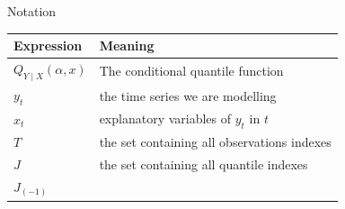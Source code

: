 \documentclass[11pt]{beamer}
\begin{document}
\begin{frame}{Notation}

\small

\begin{longtable}[]{@{}ll@{}}
\toprule
\begin{minipage}[b]{0.14\columnwidth}\raggedright\strut
Expression\strut
\end{minipage} & \begin{minipage}[b]{0.80\columnwidth}\raggedright\strut
Meaning\strut
\end{minipage}\tabularnewline
\midrule
\endhead
\begin{minipage}[t]{0.14\columnwidth}\raggedright\strut
\(Q_{Y \mid X}(\alpha,x)\)\strut
\end{minipage} & \begin{minipage}[t]{0.80\columnwidth}\raggedright\strut
The conditional quantile function\strut
\end{minipage}\tabularnewline
\begin{minipage}[t]{0.14\columnwidth}\raggedright\strut
\(y_t\)\strut
\end{minipage} & \begin{minipage}[t]{0.80\columnwidth}\raggedright\strut
the time series we are modelling\strut
\end{minipage}\tabularnewline
\begin{minipage}[t]{0.14\columnwidth}\raggedright\strut
\(x_t\)\strut
\end{minipage} & \begin{minipage}[t]{0.80\columnwidth}\raggedright\strut
explanatory variables of \(y_t\) in \(t\)\strut
\end{minipage}\tabularnewline
\begin{minipage}[t]{0.14\columnwidth}\raggedright\strut
\(T\)\strut
\end{minipage} & \begin{minipage}[t]{0.80\columnwidth}\raggedright\strut
the set containing all observations indexes\strut
\end{minipage}\tabularnewline
\begin{minipage}[t]{0.14\columnwidth}\raggedright\strut
\(J\)\strut
\end{minipage} & \begin{minipage}[t]{0.80\columnwidth}\raggedright\strut
the set containing all quantile indexes\strut
\end{minipage}\tabularnewline
\begin{minipage}[t]{0.14\columnwidth}\raggedright\strut
\(J_{(-1)}\)\strut

\end{minipage}
\end{longtable}
\end{frame}
\end{document}
